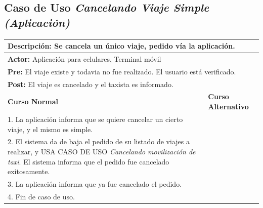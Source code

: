 \documentclass[a4paper]{article}
\begin{document}
\subsection{Caso de Uso \textit{Cancelando Viaje Simple (Aplicaci\'on)}}
\begin{center}
\begin{tabular}{|p{10cm} | p{6cm}|}
\hline
\multicolumn{2}{|p{16cm}|}{\textbf{Descripci\'on:} Se cancela un \'unico viaje, pedido v\'ia la aplicaci\'on. } \\
\hline
\multicolumn{2}{|l|}{\textbf{Actor:} Aplicaci\'on para celulares, Terminal m\'ovil} \\
\hline
\multicolumn{2}{|l|}{\textbf{Pre:} El viaje existe y todavia no fue realizado. El usuario est\'a verificado.} \\
\hline
\multicolumn{2}{|p{16cm}|}{\textbf{Post:} El viaje es cancelado y el taxista es informado.}\\
\hline
\textbf{Curso Normal}  & \textbf{Curso Alternativo} \\ \hline
1. La aplicaci\'on informa que se quiere cancelar un cierto viaje, y el mismo es simple. & \\ \hline
2. El sistema da de baja el pedido de su listado de viajes a realizar, y USA CASO DE USO \textit{Cancelando movilizaci\'on de taxi}. El sistema informa que el pedido fue cancelado exitosamente. & \\ \hline
3. La aplicaci\'on informa que ya fue cancelado el pedido. & \\ \hline
4. Fin de caso de uso. & \\ \hline
\end{tabular}
\end{center}
\end{document}
